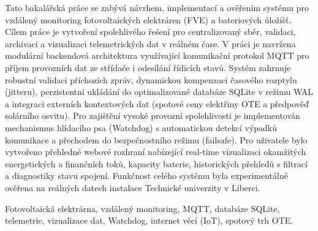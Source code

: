 \documentclass[FM,BP]{tulthesis}
\begin{document}

	\begin{abstractCZ}
	Tato bakalářská práce se zabývá návrhem, implementací a ověřením systému
	pro vzdálený monitoring fotovoltaických elektráren (FVE) a bateriových úložišť.
	Cílem práce je vytvoření spolehlivého řešení pro centralizovaný sběr, validaci,
	archivaci a vizualizaci telemetrických dat v reálném čase. V práci je navržena
	modulární backendová architektura využívající komunikační protokol MQTT pro příjem
	provozních dat ze střídače i odesílání řídicích stavů. Systém zahrnuje robustní
	validaci příchozích zpráv, dynamickou kompenzaci časového rozptylu (jitteru),
	perzistentní ukládání do optimalizované databáze SQLite v režimu WAL a integraci
	externích kontextových dat (spotové ceny elektřiny OTE a předpověď solárního osvitu).
	Pro zajištění vysoké provozní spolehlivosti je implementován mechanismus hlídacího
	psa (Watchdog) s automatickou detekcí výpadků komunikace a přechodem do bezpečnostního
	režimu (failsafe). Pro uživatele bylo vytvořeno přehledné webové rozhraní nabízející
	real-time vizualizaci okamžitých energetických a finančních toků, kapacity baterie,
	historických přehledů s filtrací a diagnostiky stavu spojení. Funkčnost celého systému
	byla experimentálně ověřena na reálných datech instalace Technické univerzity v Liberci.
	\end{abstractCZ}

	\begin{keywordsCZ}
	Fotovoltaická elektrárna, vzdálený monitoring, MQTT, databáze SQLite, telemetrie,
	vizualizace dat, Watchdog, internet věcí (IoT), spotový trh OTE.
	\end{keywordsCZ}

	\vspace{1.5cm}
\end{document}
